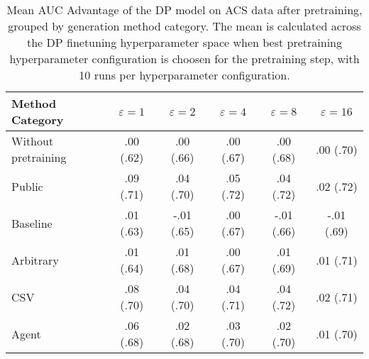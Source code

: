\begin{table}[h!]
    \centering
    \caption{Mean AUC Advantage of the DP model on ACS data after pretraining, grouped by generation method category. The mean is calculated across the DP finetuning hyperparameter space when best pretraining hyperparameter configuration is choosen for the pretraining step, with 10 runs per hyperparameter configuration.}
    \label{tab:epsilon_comparison}
    \begin{tabular}{lccccc}
    \toprule
    Method Category & $\varepsilon=1$ & $\varepsilon=2$ & $\varepsilon=4$ & $\varepsilon=8$ & $\varepsilon=16$ \\
    \midrule
    Without pretraining & .00 {\small (.62)} & .00 {\small (.66)} & .00 {\small (.67)} & .00 {\small (.68)} & .00 {\small (.70)} \\
    \arrayrulecolor{black!50!}\midrule
    Public & \cellcolor{gold!30}.09 {\small (.71)} & \cellcolor{gold!30}.04 {\small (.70)} & \cellcolor{gold!30}.05 {\small (.72)} & \cellcolor{gold!30}.04 {\small (.72)} & \cellcolor{gold!30}.02 {\small (.72)} \\
    \arrayrulecolor{black!50!}\midrule
    Baseline & .01 {\small (.63)} & -.01 {\small (.65)} & .00 {\small (.67)} & -.01 {\small (.66)} & -.01 {\small (.69)} \\
    \arrayrulecolor{black!50!}\midrule
    Arbitrary & .01 {\small (.64)} & .01 {\small (.68)} & .00 {\small (.67)} & .01 {\small (.69)} & \cellcolor{bronze!30}.01 {\small (.71)} \\
    \arrayrulecolor{black!50!}\midrule
    CSV & \cellcolor{silver!30}.08 {\small (.70)} & \cellcolor{silver!30}.04 {\small (.70)} & \cellcolor{silver!30}.04 {\small (.71)} & \cellcolor{silver!30}.04 {\small (.72)} & \cellcolor{silver!30}.02 {\small (.71)} \\
    Agent & \cellcolor{bronze!30}.06 {\small (.68)} & \cellcolor{bronze!30}.02 {\small (.68)} & \cellcolor{bronze!30}.03 {\small (.70)} & \cellcolor{bronze!30}.02 {\small (.70)} & .01 {\small (.70)} \\
    \bottomrule
    \end{tabular}
\end{table}